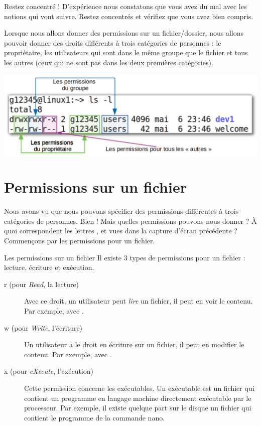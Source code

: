 \documentclass[a4paper,11pt]{style-esi/td}
\begin{document}
		\begin{alerttbox}{Restez concentré !} 
			D'expérience nous constatons que vous avez du mal avec 
			les notions qui vont suivre.
			Restez concentrés et vérifiez que vous avez bien compris.
		\end{alerttbox}
		
		Lorsque nous allons donner des permissions sur un fichier/dossier,
		nous allons pouvoir donner des droits différents à trois catégories
		de personnes : le propriétaire, les utilisateurs qui sont dans le même
		groupe que le fichier et tous les \og{}autres\fg{} 
		(ceux qui ne sont pas dans les deux premières catégories).

		\begin{center}
			\includegraphics[width=.8\textwidth]{image/categorie}
		\end{center}

    \section{Permissions sur un fichier}  

		Nous avons vu que nous pouvons spécifier des permissions différentes
		à trois catégories de personnes.
		Bien ! Mais quelles permissions pouvons-nous donner ?
		À quoi correspondent les lettres ,  et 
		vues dans la capture d'écran précédente ?
		Commençons par les permissions pour un fichier.

		\begin{theorie}{Les permissions sur un fichier}
			Il existe 3 types de permissions pour un fichier : 
			lecture, écriture et exécution.
			\begin{description}
			\item[r (pour \emph{Read}, la lecture)] 
				Avec ce droit, un utilisateur peut 
				\emph{lire} un fichier, il peut en voir le contenu. 
				Par exemple, avec .
			\item[w (pour \emph{Write}, l'écriture)]
				Un utilisateur a le droit en écriture sur un fichier, 
				il peut en modifier le contenu. 
				Par exemple, avec .
			\item[x (pour \emph{eXecute}, l'exécution)]
				Cette permission concerne les exécutables. 
				Un exécutable est un fichier qui contient 
				un programme en langage machine 
				directement exécutable par le processeur.
				Par exemple, il existe quelque part sur le disque 
				un fichier  
				qui contient le programme de la commande nano.
			\end{description}
		\end{theorie}
\end{document}
